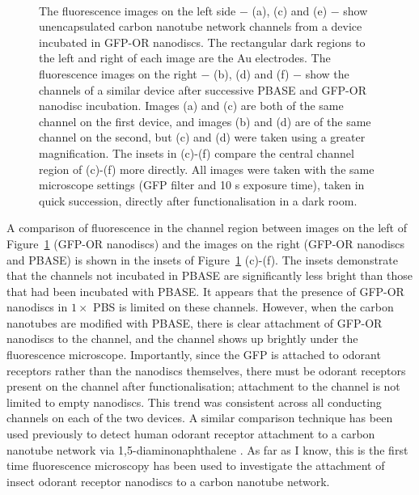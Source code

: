 \documentclass[
  a4paper,
]{scrbook}
\begin{document}
\begin{figure}
\begin{minipage}[t]{0.45\linewidth}
{{}

}

\end{minipage}%
%
\begin{minipage}[t]{0.01\linewidth}

{\centering 

~

}

\end{minipage}%

\caption[Fluorescence images showing unencapsulated carbon nanotube
network channels from a device incubated in GFP-OR nanodiscs, with or
without initial incubation in PBASE.]{\label{fig-PBASE-GFP-ORs}The
fluorescence images on the left side \(-\) (a), (c) and (e) \(-\) show
unencapsulated carbon nanotube network channels from a device incubated
in GFP-OR nanodiscs. The rectangular dark regions to the left and right
of each image are the Au electrodes. The fluorescence images on the
right \(-\) (b), (d) and (f) \(-\) show the channels of a similar device
after successive PBASE and GFP-OR nanodisc incubation. Images (a) and
(c) are both of the same channel on the first device, and images (b) and
(d) are of the same channel on the second, but (c) and (d) were taken
using a greater magnification. The insets in (c)-(f) compare the central
channel region of (c)-(f) more directly. All images were taken with the
same microscope settings (GFP filter and 10 s exposure time), taken in
quick succession, directly after functionalisation in a dark room.}

\end{figure}

A comparison of fluorescence in the channel region between images on the
left of Figure~\ref{fig-PBASE-GFP-ORs} (GFP-OR nanodiscs) and the images
on the right (GFP-OR nanodiscs and PBASE) is shown in the insets of
Figure~\ref{fig-PBASE-GFP-ORs} (c)-(f). The insets demonstrate that the
channels not incubated in PBASE are significantly less bright than those
that had been incubated with PBASE. It appears that the presence of
GFP-OR nanodiscs in \(1 \times\) PBS is limited on these channels.
However, when the carbon nanotubes are modified with PBASE, there is
clear attachment of GFP-OR nanodiscs to the channel, and the channel
shows up brightly under the fluorescence microscope. Importantly, since
the GFP is attached to odorant receptors rather than the nanodiscs
themselves, there must be odorant receptors present on the channel after
functionalisation; attachment to the channel is not limited to empty
nanodiscs. This trend was consistent across all conducting channels on
each of the two devices. A similar comparison technique has been used
previously to detect human odorant receptor attachment to a carbon
nanotube network via 1,5-diaminonaphthalene \autocite{Lee2012b}. As far
as I know, this is the first time fluorescence microscopy has been used
to investigate the attachment of insect odorant receptor nanodiscs to a
carbon nanotube network.
\end{document}
